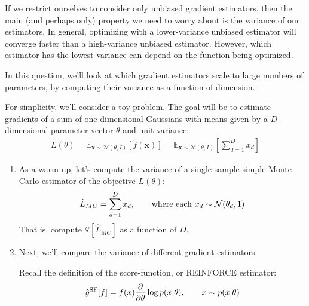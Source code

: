 \documentclass{harvardml}
\newcommand{\bx}{\mathbf{x}}
\newcommand{\distNorm}{\mathcal{N}}
\newcommand{\var}{\mathbb{V}}
\newcommand{\E}{\mathbb{E}}
\newcommand{\PT}{\frac{\partial}{\partial \theta}}
\theoremstyle{plain}
\begin{document}









\begin{problem}

If we restrict ourselves to consider only unbiased gradient estimators, then the main (and perhaps only) property we need to worry about is the variance of our estimators.
In general, optimizing with a lower-variance unbiased estimator will converge faster than a high-variance unbiased estimator.
However, which estimator has the lowest variance can depend on the function being optimized.

In this question, we'll look at which gradient estimators scale to large numbers of parameters, by computing their variance as a function of dimension.

For simplicity, we'll consider a toy problem.
The goal will be to estimate gradients of a sum of one-dimensional Gaussians with means given by a $D$-dimensional parameter vector $\theta$ and unit variance:
%
\begin{align}
L(\theta) 
= \E_{\bx \sim \distNorm(\theta, I)} \left[ f(\bx) \right]
= \E_{\bx \sim \distNorm(\theta, I)} \left[ \sum_{d=1}^D x_d \right]
\end{align}



\begin{enumerate}[label=(\alph*)]
\item As a warm-up, let's compute the variance of a single-sample simple Monte Carlo estimator of the objective $L(\theta)$:
%
\begin{align}
\hat L_{MC} 
= \sum_{d=1}^D x_d, \qquad \textnormal{where each } x_d \sim \distNorm(\theta_d, 1)
\end{align}
%
That is, compute $\var \left[ \hat L_{MC} \right]$ as a function of $D$.

\item Next, we'll compare the variance of different gradient estimators.

Recall the definition of the score-function, or REINFORCE estimator:
%
\begin{align}
\hat g^\textnormal{SF}[f] = f(x) \PT \log p(x | \theta), \qquad x \sim p(x | \theta)
\end{align}
%


\end{enumerate}
\end{problem}
\end{document}
